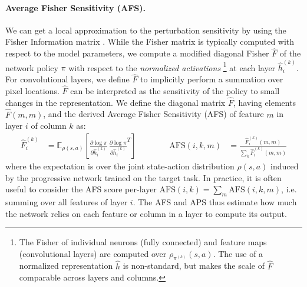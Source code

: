 \paragraph{Average Fisher Sensitivity (AFS).}
We can get a local approximation to the perturbation sensitivity by using
the Fisher Information matrix
\cite{amari98natural}. While the Fisher matrix is typically computed with
respect to the model
parameters, we compute a modified diagonal Fisher $\hat{F}$ of the network policy $\pi$
with respect to the \textit{normalized activations}
\footnote{The Fisher of individual neurons (fully connected) and feature maps
(convolutional layers) are computed over $\rho_{\pi^{(k)}}(s,a)$. The use of a normalized
representation $\hat{h}$ is non-standard, but makes the scale of $\hat{F}$
comparable across layers and columns.}
at each layer $\hat{h}_i^{(k)}$. For convolutional layers, we define
$\hat{F}$ to implicitly perform a summation over pixel locations. $\hat{F}$ can
be interpreted as the sensitivity of the policy to small changes in the
representation. We define the diagonal matrix $\hat{F}$, having
elements $\hat{F}(m,m)$, and the derived Average Fisher
Sensitivity (AFS) of feature $m$ in layer $i$ of column $k$ as:
\begin{align*}
\hat{F}_i^{(k)} &=
     \mathbb{E}_{\rho(s, a)}
        \left[
          \frac {\partial \log \pi} {\partial \hat{h}_i^{(k)}} \,
          \frac {\partial \log \pi} {\partial \hat{h}_i^{(k)}}^T
        \right]
& \hspace{1cm} &
\text{AFS}(i,k,m) &=
    \frac{\hat{F}_i^{(k)}(m,m)}{\sum_k \hat{F}_i^{(k)}(m,m)}
\end{align*}
where the expectation is over the joint state-action distribution $\rho(s,a)$
induced by the progressive network
trained on the target task. In practice, it is often useful to consider the AFS
score per-layer $\text{AFS}(i,k) = \sum_m \text{AFS}(i,k,m)$, i.e. summing over
all features of layer $i$. The AFS and APS thus estimate how much
the network relies on each feature or column in a layer to compute its output.
